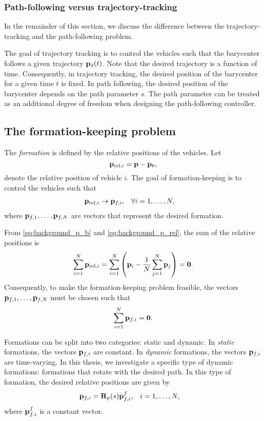 \subsubsection{Path-following versus trajectory-tracking}
In the remainder of this section, we discuss the difference between the trajectory-tracking and the path-following problem.

The goal of trajectory tracking is to control the vehicles such that the barycenter follows a given trajectory $\mathbf{p}_d(t)$.
Note that the desired trajectory is a function of time.
Consequently, in trajectory tracking, the desired position of the barycenter for a given time $t$ is fixed.
In path following, the desired position of the barycenter depends on the path parameter $s$.
The path parameter can be treated as an additional degree of freedom when designing the path-following controller.

\subsection{The formation-keeping problem}
\label{sec:background_formation_keeping}
The \emph{formation} is defined by the relative positions of the vehicles.
Let
\begin{equation}
    \mathbf{p}_{{\rm rel}, i} = \mathbf{p} - \mathbf{p}_b,
    \label{eq:background_p_rel}
\end{equation}
denote the relative position of vehicle $i$.
The goal of formation-keeping is to control the vehicles such that
\begin{align}
    &\mathbf{p}_{{\rm rel}, i} \rightarrow \mathbf{p}_{f, i}, &
    & \forall i = 1, \ldots, N,
\end{align}
where $\mathbf{p}_{f, 1}, \ldots, \mathbf{p}_{f, N}$ are vectors that represent the desired formation.

From \eqref{eq:background_p_b} and \eqref{eq:background_p_rel}, the sum of the relative positions is
\begin{equation}
    \sum_{i=1}^N \mathbf{p}_{{\rm rel}, i} = \sum_{i=1}^N \left(\mathbf{p}_i - \frac{1}{N}\sum_{j=1}^N \mathbf{p}_j \right) = \mathbf{0}.
\end{equation}
Consequently, to make the formation-keeping problem feasible, the vectors $\mathbf{p}_{f, 1}, \ldots, \mathbf{p}_{f, N}$ must be chosen such that
\begin{equation}
    \sum_{i=1}^N \mathbf{p}_{f, i} = \mathbf{0}.
\end{equation}

Formations can be split into two categories: static and dynamic.
In \emph{static} formations, the vectors $\mathbf{p}_{f, i}$ are constant.
In \emph{dynamic} formations, the vectors $\mathbf{p}_{f, i}$ are time-varying.
In this thesis, we investigate a specific type of dynamic formations: formations that rotate with the desired path.
In this type of formation, the desired relative positions are given by
\begin{align}
    \mathbf{p}_{f, i} &= \mathbf{R}_p(s) \mathbf{p}_{f, i}^f,&
    i &= 1, \ldots, N,
\end{align}
where $\mathbf{p}_{f, i}^f$ is a constant vector.

